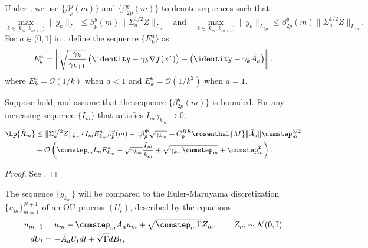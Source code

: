 \documentclass[11pt]{article}
\begin{document}
Under , we use $\{\beta_p^y (m)\}$ and $\{\beta_{2p}^y (m)\} $ to denote sequences such that
\begin{equation}\label{eq:yn_interval_bound}
    \max_{k \in [k_m, k_{m+1})} \lVert y_k \rVert_{L_p}
    \leq \beta_p^y (m) \lVert \Sigma_a^{1/2} Z \rVert_{L_p}    
    \quad 
    \text{and} \quad
    \max_{k \in [k_m, k_{m+1})} \lVert y_k \rVert_{L_{2p}} \leq  
    \beta_{2p}^y (m) \lVert \Sigma_a^{1/2} Z \rVert_{L_{2p}}
    .
\end{equation}
For $a \in (0, 1]$ in , define the sequence $\{E_k^a\}$ as
\begin{equation}\label{eq:Eka_def}
     E_k^a = \left\lVert \sqrt{\frac{\gamma_k}{\gamma_{k+1}}} \left( \identity - \gamma_k \nabla \bar{f}(x^*) \right) - \left(\identity - \gamma_k \bar{A}_a \right) \right\rVert ,
\end{equation}
where $E_k^a = \mathcal{O}(1/k)$ when $a < 1$ and $E_k^a = \mathcal{O}(1/k^2)$ when $a = 1$.
\begin{lemma}\label{lem:general_remainder}
    Suppose  hold, and assume that the sequence $\{\beta_{2p}^y(m)\}$ is bounded.
    For any increasing sequence $\{I_m\}$ that satisfies $I_m \gamma_{k_m} \to 0$,
    \begin{equation*}
    \begin{split}
    \Lp{\tilde{R}_m} 
    &\leq \lVert \Sigma_a^{1/2}Z \rVert_{L_p} \cdot I_m E_{k_m}^a \beta_p^y (m) + 4 \beta_p^{\Phi} \sqrt{\gamma_{k_m}}
    + 
    C_p^{BR} \rosenthal{M} \lVert \bar{A}_a \rVert \cumstep_m^{3/2}  \\ 
    &
    + \mathcal{O}\left(\cumstep_{m} I_m E_{k_m}^a 
    + \sqrt{\gamma_{k_m}} \frac{I_m}{k_m} + \sqrt{\gamma_{k_m} \cumstep_m}
    + \cumstep_m^2
    \right)
    .
    \end{split}
    \end{equation*}
\end{lemma}
\begin{proof}
    See .
\end{proof}
The sequence $\{y_{k_m}\}$ will be compared to the Euler-Maruyama discretization $\{u_m\}_{m=1}^{N+1}$ of an OU process $(U_t)$, described by the equations
\begin{equation*}
\begin{split}
    u_{m+1} &= u_m - \cumstep_m \bar{A}_a u_m + \sqrt{\cumstep_m \Gamma} Z_m, \qquad Z_m \sim \mathcal{N}(0, \mathbb{I})     
    \\ 
    dU_t &= -\bar{A}_a U_t dt + \sqrt{\Gamma} dB_t ,
\end{split}
\end{equation*}
\end{document}

